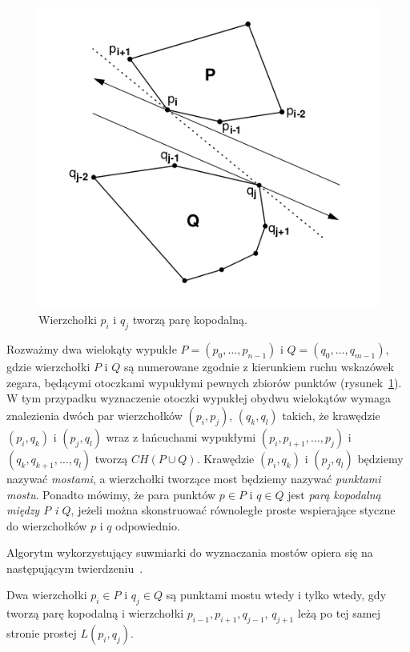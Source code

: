 \begin{figure}[htb]
  \centering
  \includegraphics[scale=0.5]{img/calipers4}
  \caption{\label{img:calipers4} Wierzchołki $p_i$ i $q_j$ tworzą parę
    kopodalną.}
\end{figure}

Rozważmy dwa wielokąty wypukłe $P = (p_0, \ldots, p_{n-1})$ i $Q =
(q_0, \ldots, q_{m-1})$, gdzie wierzchołki $P$ i $Q$ są numerowane
zgodnie z kierunkiem ruchu wskazówek zegara, będącymi otoczkami
wypukłymi pewnych zbiorów punktów (rysunek~\ref{img:calipers4}). W tym
przypadku wyznaczenie otoczki wypukłej obydwu wielokątów wymaga
znalezienia dwóch par wierzchołków $(p_i, p_j)$, $(q_k, q_l)$ takich,
że krawędzie $(p_i, q_k)$ i $(p_j, q_l)$ wraz z łańcuchami wypukłymi
$(p_i, p_{i+1}, \ldots, p_j)$ i $(q_k, q_{k+1}, \ldots, q_l)$ tworzą
$CH(P \cup Q)$. Krawędzie $(p_i, q_k)$ i $(p_j, q_l)$ będziemy nazywać
\emph{mostami}, a wierzchołki tworzące most będziemy nazywać
\emph{punktami mostu}. Ponadto mówimy, że para punktów $p \in P$ i $q
\in Q$ jest \emph{parą kopodalną między $P$ i $Q$}, jeżeli można
skonstruować równoległe proste wspierające styczne do wierzchołków $p$
i $q$ odpowiednio.

Algorytm wykorzystujący suwmiarki do wyznaczania mostów opiera się na
następującym twierdzeniu~\cite{Toussaint83}.

\begin{twierdzenie}[Toussaint 1983]
\label{thm:bridge}
Dwa wierzchołki $p_i \in P$ i $q_j \in Q$ są punktami mostu wtedy i
tylko wtedy, gdy tworzą parę kopodalną i wierzchołki $p_{i-1},
p_{i+1}, q_{j-1}$, $ q_{j+1}$ leżą po tej samej stronie prostej
$L(p_i, q_j)$.
\end{twierdzenie}

